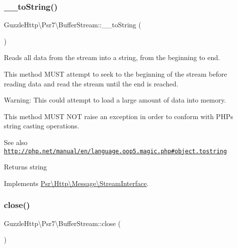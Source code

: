\subsubsection{\texorpdfstring{\+\_\+\+\_\+to\+String()}{\_\_toString()}}
{\footnotesize\ttfamily Guzzle\+Http\textbackslash{}\+Psr7\textbackslash{}\+Buffer\+Stream\+::\+\_\+\+\_\+to\+String (\begin{DoxyParamCaption}{ }\end{DoxyParamCaption})}

Reads all data from the stream into a string, from the beginning to end.

This method M\+U\+ST attempt to seek to the beginning of the stream before reading data and read the stream until the end is reached.

Warning\+: This could attempt to load a large amount of data into memory.

This method M\+U\+ST N\+OT raise an exception in order to conform with P\+HP\textquotesingle{}s string casting operations.

\begin{DoxySeeAlso}{See also}
\href{http://php.net/manual/en/language.oop5.magic.php#object.tostring}{\tt http\+://php.\+net/manual/en/language.\+oop5.\+magic.\+php\#object.\+tostring} 
\end{DoxySeeAlso}
\begin{DoxyReturn}{Returns}
string 
\end{DoxyReturn}


Implements \hyperlink{interfacePsr_1_1Http_1_1Message_1_1StreamInterface_a72df4e8851ae1a81087f3415fd6d73cd}{Psr\textbackslash{}\+Http\textbackslash{}\+Message\textbackslash{}\+Stream\+Interface}.

\mbox{\label{classGuzzleHttp_1_1Psr7_1_1BufferStream_a1a5a3b008a4b806c90125ad4804973be}} 
\subsubsection{\texorpdfstring{close()}{close()}}
{\footnotesize\ttfamily Guzzle\+Http\textbackslash{}\+Psr7\textbackslash{}\+Buffer\+Stream\+::close (\begin{DoxyParamCaption}{ }\end{DoxyParamCaption})}

